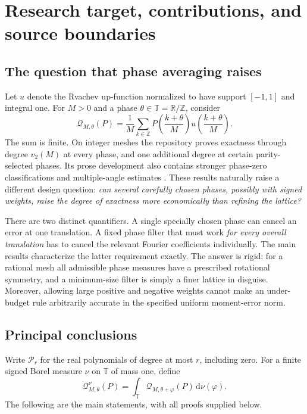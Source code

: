 \documentclass[11pt,a4paper]{article}
\numberwithin{equation}{section}
\theoremstyle{definition}
\theoremstyle{remark}
\newcommand{\R}{\mathbb R}\newcommand{\Z}{\mathbb Z}\newcommand{\N}{\mathbb N}
\newcommand{\T}{\mathbb T}\newcommand{\C}{\mathbb C}
\newcommand{\dd}{\,\mathrm d}\newcommand{\ii}{\mathrm i}
\newcommand{\Pol}{\mathcal P}\newcommand{\norm}[1]{\left\lVert#1\right\rVert}
\newcommand{\Q}{\mathcal Q}\newcommand{\Def}{\mathcal D}
\begin{document}
\tableofcontents
\newpage

\section{Research target, contributions, and source boundaries}

\subsection{The question that phase averaging raises}

Let $u$ denote the Rvachev up-function normalized to have support $[-1,1]$
and integral one. For $M>0$ and a phase $\theta\in\T=\R/\Z$, consider
\begin{equation}
 \Q_{M,\theta}(P)
 =\frac1M\sum_{k\in\Z}
 P\!\left(\frac{k+\theta}{M}\right)
 u\!\left(\frac{k+\theta}{M}\right).
 \label{eq:quadrature}
\end{equation}
The sum is finite. On integer meshes the repository proves exactness through
degree $v_2(M)$ at every phase, and one additional degree at certain
parity-selected phases. Its prose development also contains stronger
phase-zero classifications and multiple-angle estimates
\cite{repoLean,repoComb}. These results naturally raise a different design
question: \emph{can several carefully chosen phases, possibly with signed
weights, raise the degree of exactness more economically than refining the
lattice?}

There are two distinct quantifiers. A single specially chosen phase can
cancel an error at one translation. A fixed phase filter that must work
\emph{for every overall translation} has to cancel the relevant Fourier
coefficients individually. The main results characterize the latter
requirement exactly. The answer is rigid: for a rational mesh all admissible
phase measures have a prescribed rotational symmetry, and a minimum-size
filter is simply a finer lattice in disguise. Moreover, allowing large
positive and negative weights cannot make an under-budget rule arbitrarily
accurate in the specified uniform moment-error norm.

\subsection{Principal conclusions}

Write $\Pol_r$ for the real polynomials of degree at most $r$, including zero.
For a finite signed Borel measure $\nu$ on $\T$ of mass one, define
\begin{equation}
 \Q^\nu_{M,\theta}(P)
 =\int_\T\Q_{M,\theta+\varphi}(P)\dd\nu(\varphi).
 \label{eq:filtered}
\end{equation}
The following are the main statements, with all proofs supplied below.
\end{document}
